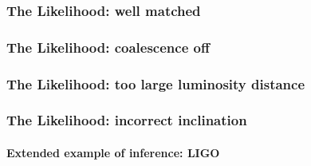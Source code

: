 \documentclass[%
]{beamer}
\begin{document}
\begin{frame}
    \frametitle<1>{The Likelihood: well matched}
    \frametitle<2>{The Likelihood: coalescence off}
    \frametitle<3>{The Likelihood: too large luminosity distance}
    \frametitle<4>{The Likelihood: incorrect inclination}
    \framesubtitle{Extended example of inference: LIGO}

\end{frame}
\end{document}

